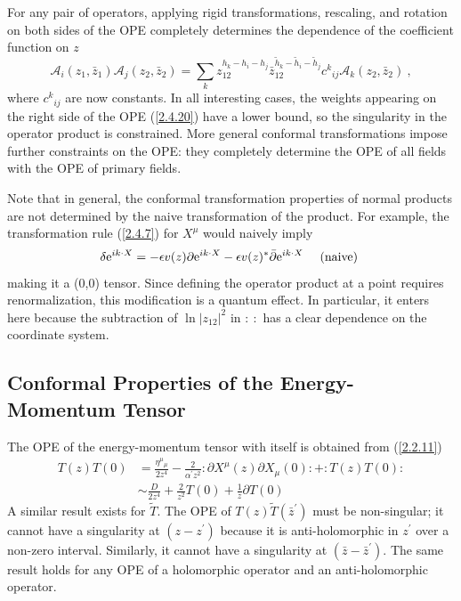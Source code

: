 For any pair of operators, applying rigid transformations, rescaling, and rotation on both sides of the OPE completely determines the dependence of the coefficient function on $z$    
\begin{equation}\label{2.4.20}
	\mathscr{A}_{i}(z_{1}, \bar{z}_{1}) \mathscr{A}_{j}(z_{2}, \bar{z}_{2})=\sum_{k} z_{12}^{h_{k}-h_{i}-h_{j}} 
	\bar{z}_{12}^{\tilde{h}_{k}-\tilde{h}_{i}-\tilde{h}_{j} }c^{k}{}_{i j} \mathscr{A}_{k}(z_{2}, \bar{z}_{2}) \:,
\end{equation}
where $c^k{}_{ij}$ are now constants. In all interesting cases, the weights appearing on the right side of the OPE (\ref{2.4.20}) have a lower bound, so the singularity in the operator product is constrained.    
More general conformal transformations impose further constraints on the OPE: they completely determine the OPE of all fields with the OPE of primary fields.    

Note that in general, the conformal transformation properties of normal products are not determined by the naive transformation of the product.    
For example, the transformation rule (\ref{2.4.7}) for $X^\mu$ would naively imply    
\begin{equation}
	\delta \mathrm{e}^{i k \cdot X}=-\epsilon v(z) \partial \mathrm{e}^{i k \cdot X}-\epsilon v(z)^{*} \bar{\partial} \mathrm{e}^{i k \cdot X} \quad \text { (naive) }
\end{equation}
making it a (0,0) tensor.    
Since defining the operator product at a point requires renormalization, this modification is a quantum effect. In particular, it enters here because the subtraction of $\ln \lvert z_{12}\rvert^{2}$ in $\mathrel{:\::}$ has a clear dependence on the coordinate system.    

\subsection*{Conformal Properties of the Energy-Momentum Tensor}
The OPE of the energy-momentum tensor with itself is obtained from (\ref{2.2.11})    
\begin{equation}\label{2.4.22}
	\begin{aligned}
		T(z) T(0) &=\frac{\eta^{\mu}{}_{\mu}}{2 z^{4}}-\frac{2}{\alpha^{\prime} z^{2}}: \mathrel{\partial X^{\mu}(z) \partial X_{\mu}(0)}:+ 
		: \mathrel{T(z) T(0)}: \\
		& \sim \frac{D}{2 z^{4}}+\frac{2}{z^{2}} T(0)+\frac{1}{z} \partial T(0)
	\end{aligned}
\end{equation}
A similar result exists for $\tilde{T}$.    
The OPE of $T(z) \tilde{T}(\bar{z}^{\prime})$ must be non-singular; it cannot have a singularity at $(z-z^{\prime})$ because it is anti-holomorphic in $z^{\prime}$ over a non-zero interval. Similarly, it cannot have a singularity at $(\bar{z}-\bar{z}^{\prime})$. The same result holds for any OPE of a holomorphic operator and an anti-holomorphic operator.    

